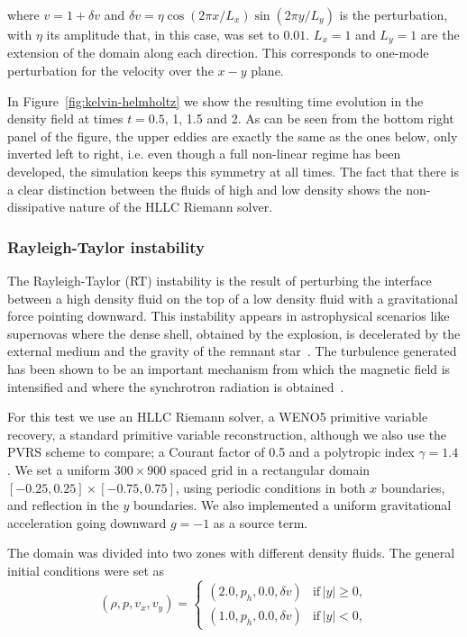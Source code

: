 \noindent where $v = 1 + \delta v$ and $\delta v = \eta \cos(2\pi x/L_x) \sin(2\pi y/L_y)$ is the perturbation, with $\eta$ its amplitude that, in this case, was set to $0.01$. $L_x=1$ and $L_y=1$ are the extension of the domain along each direction. This corresponds to one-mode perturbation for the velocity over the $x-y$ plane.
 
In Figure~\ref{fig:kelvin-helmholtz} we show the resulting time evolution in the density field at times $t = 0.5$, 1, 1.5 and 2. As can be seen from the bottom right panel of the figure, the upper eddies are exactly the same as the ones below, only inverted left to right, i.e. even though a full non-linear regime has been developed, the simulation keeps this symmetry at all times. The fact that there is a clear distinction between the fluids of high and low density shows the non-dissipative nature of the HLLC Riemann solver.

\subsubsection{Rayleigh-Taylor instability}
\label{subsubsec:rt}


 
The Rayleigh-Taylor (RT) instability is the result of perturbing the interface between a high density fluid on the top of a low density fluid with a gravitational force pointing downward. This instability appears in astrophysical scenarios like supernovas where the dense shell, obtained by the explosion, is decelerated by the external medium and the gravity of the remnant star~\citep{fraschetti2010}. The turbulence generated has been shown to be an important mechanism from which the magnetic field is intensified and where the synchrotron radiation is obtained~\citep{duffel2016}.

For this test we use an HLLC Riemann solver, a WENO5 primitive variable recovery, a standard primitive variable reconstruction, although we also use the PVRS scheme to compare; a Courant factor of 0.5 and a polytropic index $\gamma = 1.4$. We set a uniform $300\times900$ spaced grid in a rectangular domain $[-0.25,0.25]\times[-0.75,0.75]$, using periodic conditions in both $x$ boundaries, and reflection in the $y$ boundaries. We also implemented a uniform gravitational acceleration going downward $g = -1$ as a source term.

The domain was divided into two zones with different density fluids. The general initial conditions were set as
 \begin{equation}
     \left( \rho, p, v_x, v_y \right) = \left\lbrace
     \begin{array}{cl}
        (2.0,p_h,0.0,\delta v) & \mathrm{if}\, |y| \geq 0, \\
        (1.0,p_h,0.0,\delta v) &   \mathrm{if}\, |y| < 0,
     \end{array}
     \right.
 \end{equation}
 
